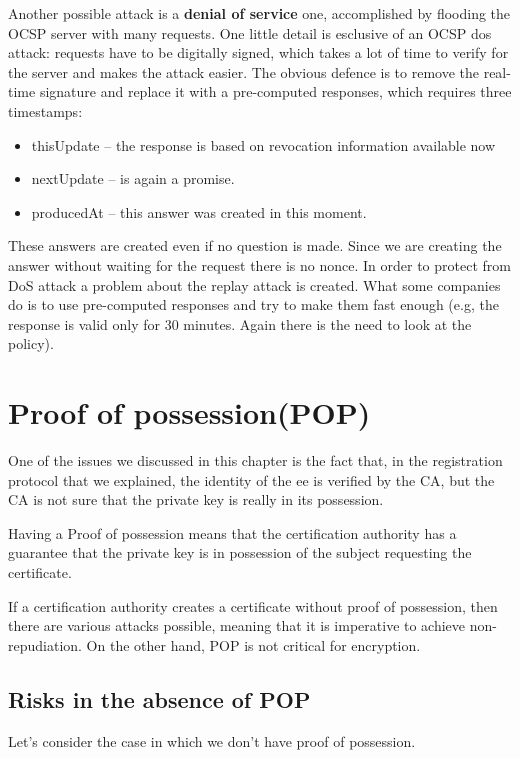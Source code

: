 Another possible attack is a \textbf{denial of service} one,
accomplished by flooding the OCSP server with many requests. One
little detail is esclusive of an OCSP dos attack: requests have to be
digitally signed, which takes a lot of time to verify for the server
and makes the attack easier. The obvious defence is to remove the
real-time signature and replace it with a pre-computed responses,
which requires three timestamps:
\begin{itemize}
  \item thisUpdate – the response is based on revocation information
    available now
  \item nextUpdate – is again a promise.
  \item producedAt – this answer was created in this moment.
\end{itemize}
These answers are created even if no question is made. Since we are
creating the answer without waiting for the request there is no nonce.
In order to protect from DoS attack a problem about the replay attack
is created. What some companies do is to use pre-computed responses
and try to make them fast enough (e.g, the response is valid only for
30 minutes. Again there is the need to look at the policy).

\section{Proof of possession(POP)}
One of the issues we discussed in this chapter is the fact that, in
the registration protocol that we explained, the identity of the ee is 
verified by the CA, but the CA is not sure that the private key is 
really in its possession.

\begin{boxH}
  Having a Proof of possession means that the certification authority
  has a guarantee that the private key is in possession of the subject
  requesting the certificate.
\end{boxH}
If a certification authority creates a certificate without proof of
possession, then there are various attacks possible, meaning that it
is imperative to achieve non-repudiation. On the other hand, POP is
not critical for encryption.
\subsection{Risks in the absence of POP}
Let's consider the case in which we don't have proof of possession.

